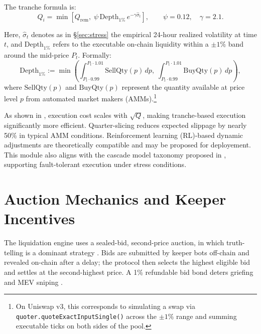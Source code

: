 \documentclass[11pt]{article}
\newcommand{\secref}[1]{\hyperref[#1]{\S\ref*{#1}}}
\begin{document}
The tranche formula is:
\begin{equation}\label{eq:tranche}
Q_i = \min \left[ Q_{\text{rem}},\;
                  \psi\,\text{Depth}_{1\%}\,e^{-\gamma \widehat{\sigma}_t} \right],
\qquad \psi = 0.12,\quad \gamma = 2.1.
\end{equation}

Here, \( \widehat{\sigma}_t \) denotes as in \secref{sec:stress} the empirical 24-hour realized volatility at time \( t \), and \( \text{Depth}_{1\%} \) refers to the executable on-chain liquidity within a \(\pm 1\%\) band around the mid-price \( P_t \). Formally:
\[
\text{Depth}_{1\%} := \min \left(
\int_{P_t \cdot 0.99}^{P_t \cdot 1.01} \text{SellQty}(p)\,dp,\;
\int_{P_t \cdot 0.99}^{P_t \cdot 1.01} \text{BuyQty}(p)\,dp
\right),
\]
where \( \text{SellQty}(p) \) and \( \text{BuyQty}(p) \) represent the quantity available at price level \( p \) from automated market makers (AMMs).\footnote{On Uniswap v3, this corresponds to simulating a swap via \texttt{quoter.quoteExactInputSingle()} across the \(\pm 1\%\) range and summing executable ticks on both sides of the pool.}

As shown in \textcite{almgren2000optimal}, execution cost scales with \( \sqrt{Q} \), making tranche-based execution significantly more efficient. Quarter-slicing reduces expected slippage by nearly 50\% in typical AMM conditions.  
Reinforcement learning (RL)-based dynamic adjustments \parencite{zhang2023adaptive} are theoretically compatible and may be proposed for deployement.  
This module also aligns with the cascade model taxonomy proposed in \textcite{zhao2025reliability}, supporting fault-tolerant execution under stress conditions.




\section{Auction Mechanics and Keeper Incentives}
\label{sec:auction}

The liquidation engine uses a sealed-bid, second-price \parencite{vickrey1961counterspeculation} auction, in which truth-telling is a dominant strategy \parencite{myerson1994bayesian}. Bids are submitted by keeper bots off-chain and revealed on-chain after a delay; the protocol then selects the highest eligible bid and settles at the second-highest price. A 1\% refundable bid bond deters griefing and MEV sniping \parencite{tian2025defi}.
\end{document}
